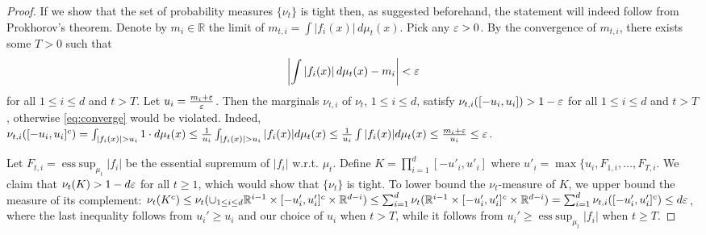 \documentclass[english]{article} %
\DeclareMathOperator{\esssup}{ess\;sup}
\newcommand{\real}{\mathbb{R}}
\theoremstyle{definition}
\begin{document}
\begin{proof}
If we show that the set of probability measures $\{\nu_t\}$ is tight then, as suggested beforehand,
the statement will indeed follow from Prokhorov's theorem.
Denote by $m_i\in \mathbb{R}$ the limit of $ m_{t,i} = \int |f_i(x)|\, d\mu_t(x)$.
Pick any $\varepsilon>0$.
By the convergence of $m_{t,i}$, there exists some $T>0$ such that
\begin{equation}
\label{eq:converge}
\left| \int |f_i(x)|\, d\mu_t (x)- m_i \right| <\varepsilon
\end{equation}
for all $1 \le i \le d$ and $t>T$. Let $u_{i}=\tfrac{m_i+\varepsilon}{\varepsilon}$. Then the marginals
$\nu_{t,i}$ of $\nu_t$, $1\le i \le d$, satisfy $\nu_{t,i}([-u_{i},u_{i}]) > 1-\varepsilon$ for all $1\le i\le d$ and $t>T$, otherwise \eqref{eq:converge} would be violated. 
Indeed, $\nu_{t,i}([-u_i,u_i]^c)=\int_{|f_i(x)|>u_i} 1\cdot d\mu_t(x)
\le \frac{1}{u_i}\int_{|f_i(x)|>u_i} |f_i(x)| d\mu_t(x)
\le \frac{1}{u_i} \int |f_i(x)| d\mu_t(x) \le \frac{m_i+\eps}{u_i}\le \eps$.

Let $F_{t,i} = \esssup_{\mu_t} |f_i|$ be the essential supremum of $|f_i|$ w.r.t. $\mu_t$.
Define 
$K=\prod_{i=1}^d [-u'_{i},u'_{i}]$ where $u'_{i}=\max\{u_{i},F_{1,i}, \ldots,F_{T,i}$.
We claim that 
$\nu_t(K)>1-d \varepsilon$ for all $t \ge 1$, which would show that $\{\nu_t\}$ is tight.
To lower bound the $\nu_t$-measure of $K$, we upper bound the measure of its complement:
$\nu_t(K^c) \le \nu_t( \cup_{1\le i \le d} \real^{i-1} \times [-u_i',u_i']^c \times \real^{d-i})
\le \sum_{i=1}^d \nu_t( \real^{i-1} \times [-u_i',u_i']^c \times \real^{d-i})
=   \sum_{i=1}^d \nu_{t,i}( [-u_i',u_i']^c )
\le d \eps$, where the last inequality follows from $u_i'\ge u_i$ and our choice of $u_i$ when $t>T$,
while it follows from $u_i'\ge \esssup_{\mu_t} |f_i|$ when $t\ge T$.
\end{proof}
\end{document}
